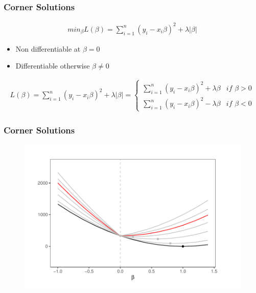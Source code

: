 \documentclass[
  shownotes,
  xcolor={svgnames},
  hyperref={colorlinks,citecolor=DarkBlue,linkcolor=DarkRed,urlcolor=DarkBlue}
  , aspectratio=169]{beamer}
\begin{document}
\begin{frame}[fragile]
\frametitle{Corner Solutions}

\begin{align}
min_{\beta} L(\beta) = \sum_{i=1}^n (y_i-x_i \beta)^2 + \lambda|\beta| 
\end{align}
\begin{itemize}
  \item Non differentiable at $\beta=0$
  \item Differentiable otherwise $\beta\neq0$
\end{itemize}

\begin{align}
L(\beta)=\sum_{i=1}^{n}(y_{i}-x_{i}\beta)^{2}+\lambda|\beta|=\begin{cases}
\sum_{i=1}^{n}(y_{i}-x_{i}\beta)^{2}+\lambda\beta & if\,\,\beta>0\\
\sum_{i=1}^{n}(y_{i}-x_{i}\beta)^{2}-\lambda\beta & if\,\,\beta<0
\end{cases}
\end{align}


\end{frame}
\begin{frame}[fragile]
\frametitle{Corner Solutions}

   \begin{figure}[H] \centering
            \captionsetup{justification=centering}
              \includegraphics[scale=0.8]{figures/lasso.pdf}
 \end{figure}

 \end{frame}
\end{document}
